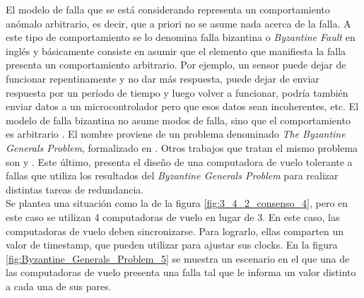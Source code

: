 El modelo de falla que se está considerando representa un comportamiento anómalo arbitrario, es decir, que a priori no se asume nada acerca de la falla. A este tipo de comportamiento se lo denomina falla bizantina o \textit{Byzantine Fault} en inglés y básicamente consiste en asumir que el elemento que manifiesta la falla presenta un comportamiento arbitrario. Por ejemplo, un sensor puede dejar de funcionar repentinamente y no dar más respuesta, puede dejar de enviar respuesta por un período de tiempo y luego volver a funcionar, podría también enviar datos a un microcontrolador pero que esos datos sean incoherentes, etc. El modelo de falla bizantina no asume modos de falla, sino que el comportamiento es arbitrario \cite{roth2021not}\cite{hiergeist2017internal}\cite{lala1994architectural}. El nombre proviene de un problema denominado \textit{The Byzantine Generals Problem}, formalizado en \cite{lamport2019byzantine}. Otros trabajos que tratan el mismo problema son \cite{pease1980reaching} y \cite{wensley1978sift}. Este último, presenta el diseño de una computadora de vuelo tolerante a fallas que utiliza los resultados del \textit{Byzantine Generals Problem} para realizar distintas tareas de redundancia.\\


Se plantea una situación como la de la figura \ref{fig:3_4_2_consenso_4}, pero en este caso se utilizan 4 computadoras de vuelo en lugar de 3. En este caso, las computadoras de vuelo deben sincronizarse. Para lograrlo, ellas comparten un valor de timestamp, que pueden utilizar para ajustar sus clocks. En la figura \ref{fig:Byzantine_Generals_Problem_5} se muestra un escenario en el que una de las computadoras de vuelo presenta una falla tal que le informa un valor distinto a cada una de sus pares.

